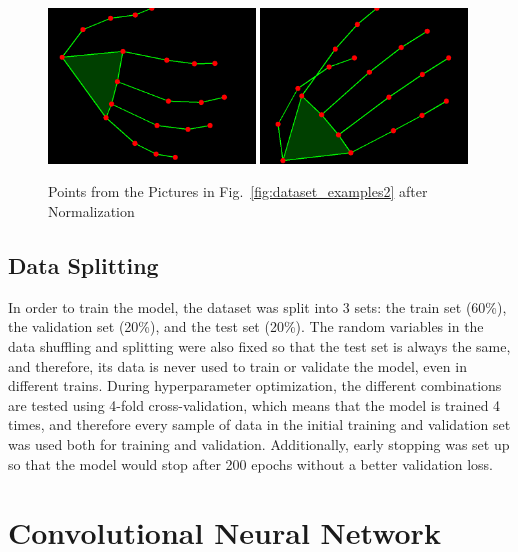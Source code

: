 \begin{figure}[H]
    \centerline{\includegraphics[width=0.49\textwidth]{figs/dataset_preprocessing3_1.png} \includegraphics[width=0.49\textwidth]{figs/dataset_preprocessing3_2.png}}
    \caption[Points from the Pictures in Fig.~\ref{fig:dataset_examples2} after Normalization]{Points from the Pictures in Fig.~\ref{fig:dataset_examples2} after Normalization}
    \label{fig:dataset_examples3}
\end{figure}

\subsection{Data Splitting}

In order to train the model, the dataset was split into 3 sets: the train set (60\%), the validation set (20\%), and the test set (20\%). The random variables in the data shuffling and splitting were also fixed so that the test set is always the same, and therefore, its data is never used to train or validate the model, even in different trains. During hyperparameter optimization, the different combinations are tested using 4-fold cross-validation, which means that the model is trained 4 times, and therefore every sample of data in the initial training and validation set was used both for training and validation. Additionally, early stopping was set up so that the model would stop after 200 epochs without a better validation loss.

\section{Convolutional Neural Network}

